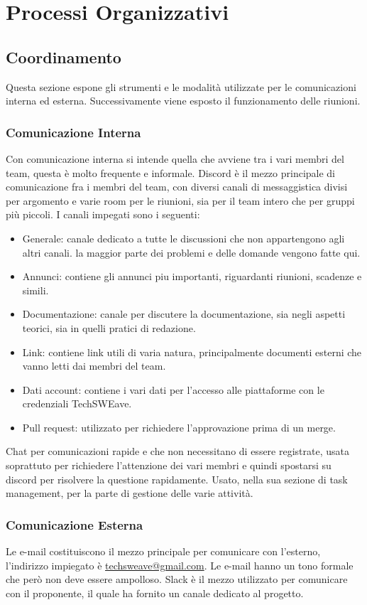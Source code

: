 \section{Processi Organizzativi}
\subsection{Coordinamento}
Questa sezione espone gli strumenti e le modalità utilizzate per le comunicazioni interna ed esterna. Successivamente viene esposto il funzionamento delle riunioni.
\subsubsection{Comunicazione Interna}
Con comunicazione interna si intende quella che avviene tra i vari membri del team, questa è molto frequente e informale.
Discord è il mezzo principale di comunicazione fra i membri del team, con diversi canali di messaggistica divisi per argomento e varie room per le riunioni, sia per il team intero che per gruppi più piccoli.
I canali impegati sono i seguenti:
\begin{itemize}
    \item Generale: canale dedicato a tutte le discussioni che non appartengono agli altri canali. la maggior parte dei problemi e delle domande vengono fatte qui.
    \item Annunci: contiene gli annunci piu importanti, riguardanti riunioni, scadenze e simili.
    \item Documentazione: canale per discutere la documentazione, sia negli aspetti teorici, sia in quelli pratici di redazione.
    \item Link: contiene link utili di varia natura, principalmente documenti esterni che vanno letti dai membri del team.
    \item Dati account: contiene i vari dati per l'accesso alle piattaforme con le credenziali TechSWEave.
    \item Pull request: utilizzato per richiedere l'approvazione prima di un merge.
\end{itemize}
Chat per comunicazioni rapide e che non necessitano di essere registrate, usata soprattuto per richiedere l'attenzione dei vari membri e quindi spostarsi su discord per risolvere la questione rapidamente.
Usato, nella sua sezione di task management, per la parte di gestione delle varie attività.
\subsubsection{Comunicazione Esterna}
Le e-mail costituiscono il mezzo principale per comunicare con l'esterno, l'indirizzo impiegato è \href{mailto:techsweave@gmail.com}{techsweave@gmail.com}. Le e-mail hanno un tono formale che però non deve essere ampolloso.
Slack è il mezzo utilizzato per comunicare con il proponente, il quale ha fornito un canale dedicato al progetto.
